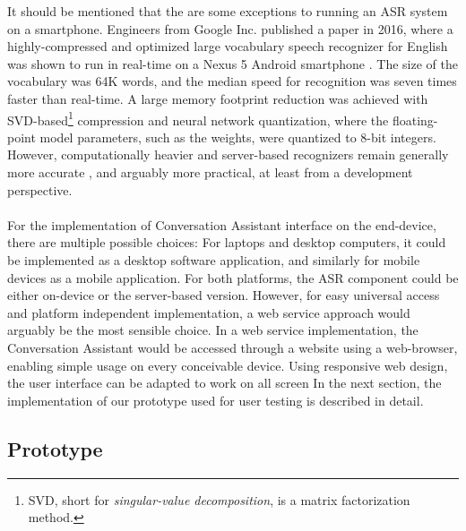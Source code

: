 \documentclass[english, 12pt, a4paper, pdftex, elec, utf8]{aaltothesis}
\begin{document}
It should be mentioned that the are some exceptions to running an ASR system on a smartphone. Engineers from Google Inc. published a paper in 2016, where a highly-compressed and optimized large vocabulary speech recognizer for English was shown to run in real-time on a Nexus 5 Android smartphone \cite{mcgraw2016personalized}. The size of the vocabulary was 64K words, and the median speed for recognition was seven times faster than real-time. A large memory footprint reduction was achieved with SVD-based\footnote{SVD, short for \textit{singular-value decomposition}, is a matrix factorization method.} compression and neural network quantization, where the floating-point model parameters, such as the weights, were quantized to 8-bit integers. However, computationally heavier and server-based recognizers remain generally more accurate \cite{xiong2016achieving}, and arguably more practical, at least from a development perspective. \\\\
For the implementation of Conversation Assistant interface on the end-device, there are multiple possible choices: For laptops and desktop computers, it could be implemented as a desktop software application, and similarly for mobile devices as a mobile application. For both platforms, the ASR component could be either on-device or the server-based version. However, for easy universal access and platform independent implementation, a web service approach would arguably be the most sensible choice. In a web service implementation, the Conversation Assistant would be accessed through a website using a web-browser, enabling simple usage on every conceivable device. Using responsive web design, the user interface can be adapted to work on all screen In the next section, the implementation of our prototype used for user testing is described in detail.

\subsection{Prototype} \label{sec:prototype}
\end{document}
